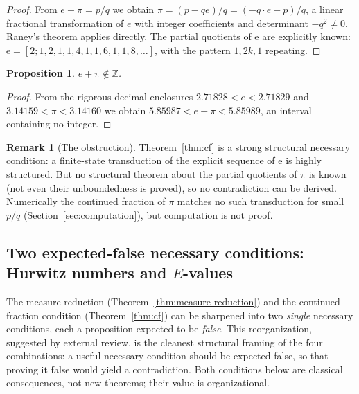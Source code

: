 \documentclass[11pt]{amsart}
\newtheorem{proposition}[theorem]{Proposition}
\theoremstyle{definition}
\newtheorem{remark}[theorem]{Remark}
\theoremstyle{remark}
\numberwithin{equation}{section}
\newcommand{\Z}{\mathbb{Z}}
\newcommand{\ee}{\mathrm{e}}
\begin{document}
\begin{proof}
From $e+\pi=p/q$ we obtain $\pi=(p-qe)/q=(-q\cdot e+p)/q$, a linear fractional transformation of $e$ with integer coefficients and determinant $-q^2\ne0$. Raney's theorem applies directly. The partial quotients of $\ee$ are explicitly known: $\ee=[2;1,2,1,1,4,1,1,6,1,1,8,\dots]$, with the pattern $1,2k,1$ repeating.
\end{proof}

\begin{proposition}\label{prop:not-integer}
$e+\pi\notin\Z$.
\end{proposition}

\begin{proof}
From the rigorous decimal enclosures $2.71828<e<2.71829$ and $3.14159<\pi<3.14160$ we obtain $5.85987<e+\pi<5.85989$, an interval containing no integer.
\end{proof}

\begin{remark}[The obstruction]
Theorem~\ref{thm:cf} is a strong structural necessary condition: a finite-state transduction of the explicit sequence of $\ee$ is highly structured. But no structural theorem about the partial quotients of $\pi$ is known (not even their unboundedness is proved), so no contradiction can be derived. Numerically the continued fraction of $\pi$ matches no such transduction for small $p/q$ (Section~\ref{sec:computation}), but computation is not proof.
\end{remark}

\subsection{Two expected-false necessary conditions: Hurwitz numbers and \texorpdfstring{$E$}{E}-values}\label{sec:expected-false}

The measure reduction (Theorem~\ref{thm:measure-reduction}) and the continued-fraction condition (Theorem~\ref{thm:cf}) can be sharpened into two \emph{single} necessary conditions, each a proposition expected to be \emph{false}. This reorganization, suggested by external review, is the cleanest structural framing of the four combinations: a useful necessary condition should be expected false, so that proving it false would yield a contradiction. Both conditions below are classical consequences, not new theorems; their value is organizational.
\end{document}
